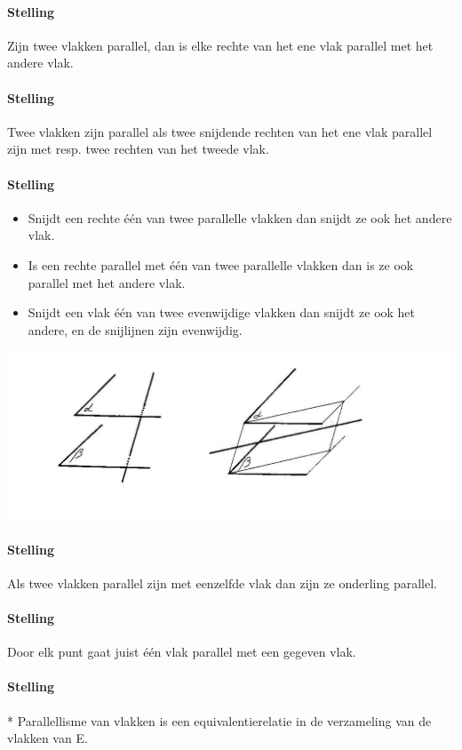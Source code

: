 \documentclass[12pt,twoside]{article}
\begin{document}
\begin{theorie}
\paragraph*{Stelling}
Zijn twee vlakken parallel, dan is elke rechte van het ene vlak parallel met het andere vlak.

\paragraph*{Stelling}
Twee vlakken zijn parallel als twee snijdende rechten van het ene vlak parallel zijn met resp. twee rechten van het tweede vlak.

\paragraph*{Stelling}
\begin{itemize}
  \item Snijdt een rechte één van twee parallelle vlakken dan snijdt ze ook het andere vlak.
  \item Is een rechte parallel met één van twee parallelle vlakken dan is ze ook parallel met het andere vlak.
  \item Snijdt een vlak één van twee evenwijdige vlakken dan snijdt ze ook het andere, en de snijlijnen zijn evenwijdig.
\end{itemize}
\begin{center}
  \includegraphics[width=.7\textwidth]{stelling_11}
\end{center}

\paragraph*{Stelling}
Als twee vlakken parallel zijn met eenzelfde vlak dan zijn ze onderling parallel.

\paragraph*{Stelling}
Door elk punt gaat juist één vlak parallel met een gegeven vlak.

\paragraph*{Stelling}*
Parallellisme van vlakken is een equivalentierelatie in de verzameling van de vlakken van E.


\end{theorie}
\end{document}
